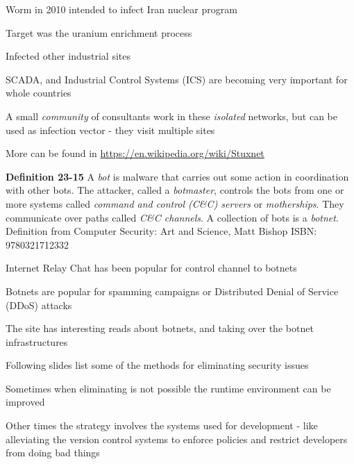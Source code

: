 \documentclass[Screen16to9,17pt]{foils}
\begin{document}

\begin{list1}
\item Worm in 2010 intended to infect Iran nuclear program
\item Target was the uranium enrichment process
\item Infected other industrial sites
\item SCADA, and Industrial Control Systems (ICS) are becoming very important for whole countries
\item A small \emph{community} of consultants work in these \emph{isolated} networks, but can be used as infection vector - they visit multiple sites
\item More can be found in \url{https://en.wikipedia.org/wiki/Stuxnet}
\end{list1}





\begin{list1}
\item {\bf Definition 23-15} A \emph{bot} is malware that carries out some action in coordination with other bots. The attacker, called a \emph{botmaster}, controls the bots from one or more systems called \emph{command and control (C\&C) servers} or \emph{motherships}. They communicate over paths called \emph{C\&C channels}. A collection of bots is a \emph{botnet}.\\
Definition from Computer Security: Art and Science, Matt Bishop ISBN: 9780321712332
\item Internet Relay Chat has been popular for control channel to botnets
\item Botnets are popular for spamming campaigns or Distributed Denial of Service (DDoS) attacks
\item The site  has interesting reads about botnets, and taking over the botnet infrastructures
\end{list1}







\begin{list2}
\item Following slides list some of the methods for eliminating security issues
\item Sometimes when eliminating is not possible the runtime environment can be improved
\item Other times the strategy involves the systems used for development - like alleviating the version control systems to enforce policies and restrict developers from doing bad things
\end{list2}
\end{document}
